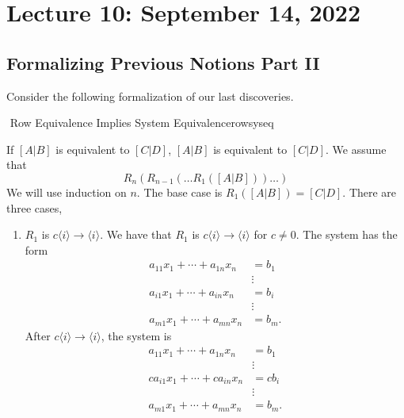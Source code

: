 \pagebreak

\section{Lecture 10: September 14, 2022}

    \subsection{Formalizing Previous Notions Part II}
    
        Consider the following formalization of our last discoveries.
        \begin{theorem}{\Stop\,\,Row Equivalence Implies System Equivalence}{rowsyseq}
        
            If \([A|B]\) is equivalent to \([C|D]\), \([A|B]\) is equivalent to \([C|D]\). We assume that 
            \begin{equation*}
                R_n(R_{n-1}(\ldots R_1([A|B]))\ldots)
            \end{equation*}
            We will use induction on \(n\). The base case is \(R_1([A|B])=[C|D]\). There are three cases,
            \begin{enumerate}
                \item \(R_1\) is \(c\langle i\rangle\to\langle i\rangle\).
                    We have that \(R_1\) is \(c\langle i \rangle \to \langle i \rangle\) for \(c\neq0\). The system has the form
                    \begin{align*}
                        a_{11}x_1+\cdots+a_{1n}x_n&=b_1 \\
                        &\vdots \\
                        a_{i1}x_1+\cdots+a_{in}x_n&=b_i \\
                        &\vdots \\
                        a_{m1}x_1+\cdots+a_{mn}x_n&=b_m.
                    \end{align*}
                    After \(c\langle i \rangle \to \langle i \rangle\), the system is
                    \begin{align*}
                        a_{11}x_1+\cdots+a_{1n}x_n&=b_1 \\
                        &\vdots \\
                        ca_{i1}x_1+\cdots+ca_{in}x_n&=cb_i \\
                        &\vdots \\
                        a_{m1}x_1+\cdots+a_{mn}x_n&=b_m.

\end{align*}
\end{enumerate}
\end{theorem}
